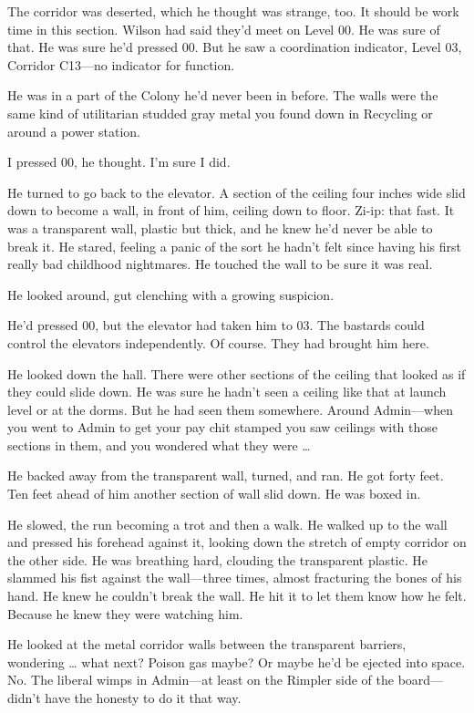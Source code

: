 The corridor was deserted, which he thought was strange, too. It should be work time in this section. Wilson had said they’d meet on Level 00. He was sure of that. He was sure he’d pressed 00. But he saw a coordination indicator, Level 03, Corridor C13—no indicator for function.

He was in a part of the Colony he’d never been in before. The walls were the same kind of utilitarian studded gray metal you found down in Recycling or around a power station.

I pressed 00, he thought. I’m sure I did.

He turned to go back to the elevator. A section of the ceiling four inches wide slid down to become a wall, in front of him, ceiling down to floor. Zi-ip: that fast. It was a transparent wall, plastic but thick, and he knew he’d never be able to break it. He stared, feeling a panic of the sort he hadn’t felt since having his first really bad childhood nightmares. He touched the wall to be sure it was real.

He looked around, gut clenching with a growing suspicion.

He’d pressed 00, but the elevator had taken him to 03. The bastards could control the elevators independently. Of course. They had brought him here.

He looked down the hall. There were other sections of the ceiling that looked as if they could slide down. He was sure he hadn’t seen a ceiling like that at launch level or at the dorms. But he had seen them somewhere. Around Admin—when you went to Admin to get your pay chit stamped you saw ceilings with those sections in them, and you wondered what they were …

He backed away from the transparent wall, turned, and ran. He got forty feet. Ten feet ahead of him another section of wall slid down. He was boxed in.

He slowed, the run becoming a trot and then a walk. He walked up to the wall and pressed his forehead against it, looking down the stretch of empty corridor on the other side. He was breathing hard, clouding the transparent plastic. He slammed his fist against the wall—three times, almost fracturing the bones of his hand. He knew he couldn’t break the wall. He hit it to let them know how he felt. Because he knew they were watching him.

He looked at the metal corridor walls between the transparent barriers, wondering … what next? Poison gas maybe? Or maybe he’d be ejected into space. No. The liberal wimps in Admin—at least on the Rimpler side of the board—didn’t have the honesty to do it that way.

